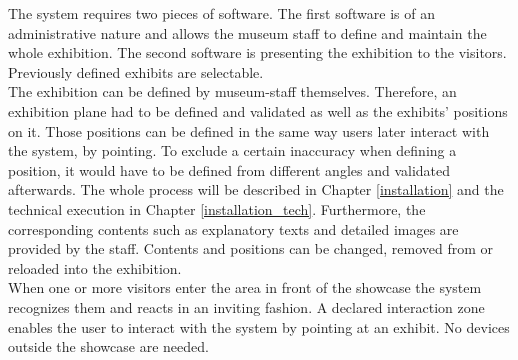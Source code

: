 The system requires two pieces of software. The first software is of an administrative nature and allows the museum staff to define and maintain the whole exhibition. The second software is presenting the exhibition to the visitors. Previously defined exhibits are selectable.
\\
The exhibition can be defined by museum-staff themselves. Therefore, an exhibition plane had to be defined and validated as well as the exhibits' positions on it. Those positions can be defined in the same way users later interact with the system, by pointing. To exclude a certain inaccuracy when defining a position, it would have to be defined from different angles and validated afterwards. The whole process will be described in Chapter \ref{installation} and the technical execution in Chapter \ref{installation_tech}. Furthermore, the corresponding contents such as explanatory texts and detailed images are provided by the staff. Contents and positions can be changed, removed from or reloaded into the exhibition.
\\
When one or more visitors enter the area in front of the showcase the system recognizes them and reacts in an inviting fashion. A declared interaction zone enables the user to interact with the system by pointing at an exhibit. No devices outside the showcase are needed. 

